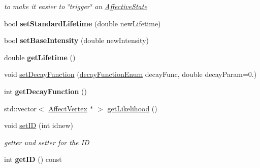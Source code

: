 \begin{DoxyCompactItemize}
\begin{DoxyCompactList}\small\item\em to make it easier to \char`\"{}trigger\char`\"{} an \hyperlink{class_affective_state}{\-Affective\-State} \end{DoxyCompactList}\item 
\hypertarget{class_affective_state_a42be8cbd6088728f2d4995c405373204}{
bool {\bfseries set\-Standard\-Lifetime} (double new\-Lifetime)}
\label{class_affective_state_a42be8cbd6088728f2d4995c405373204}

\item 
\hypertarget{class_affective_state_aac1d520a62c463f763060144ea2907b9}{
bool {\bfseries set\-Base\-Intensity} (double new\-Intensity)}
\label{class_affective_state_aac1d520a62c463f763060144ea2907b9}

\item 
\hypertarget{class_affective_state_a26df2365c23db0ecf640a06075a224b0}{
double {\bfseries get\-Lifetime} ()}
\label{class_affective_state_a26df2365c23db0ecf640a06075a224b0}

\item 
void \hyperlink{class_affective_state_ad0208fab4ea9bf577155c8aae932c96b}{set\-Decay\-Function} (\hyperlink{class_affective_state_aa47963a65353591a1e2109987ef624a1}{decay\-Function\-Enum} decay\-Func, double decay\-Param=0.)
\item 
\hypertarget{class_affective_state_a9e2e8399228a86af59cdb7406aae9813}{
int {\bfseries get\-Decay\-Function} ()}
\label{class_affective_state_a9e2e8399228a86af59cdb7406aae9813}

\item 
std\-::vector$<$ \hyperlink{class_affect_vertex}{\-Affect\-Vertex} $\ast$ $>$ \hyperlink{class_affective_state_a3e447cea61d9d9dc7b758a68a4e8e009}{get\-Likelihood} ()
\item 
\hypertarget{class_affective_state_a4093ad8a30493c8f35d400b869a33968}{
void \hyperlink{class_affective_state_a4093ad8a30493c8f35d400b869a33968}{set\-I\-D} (int idnew)}
\label{class_affective_state_a4093ad8a30493c8f35d400b869a33968}

\begin{DoxyCompactList}\small\item\em getter und setter for the \-I\-D \end{DoxyCompactList}\item 
\hypertarget{class_affective_state_a22f046f76fb1c1176ec49b803da09b8f}{
int {\bfseries get\-I\-D} () const }
\label{class_affective_state_a22f046f76fb1c1176ec49b803da09b8f}


\end{DoxyCompactItemize}
